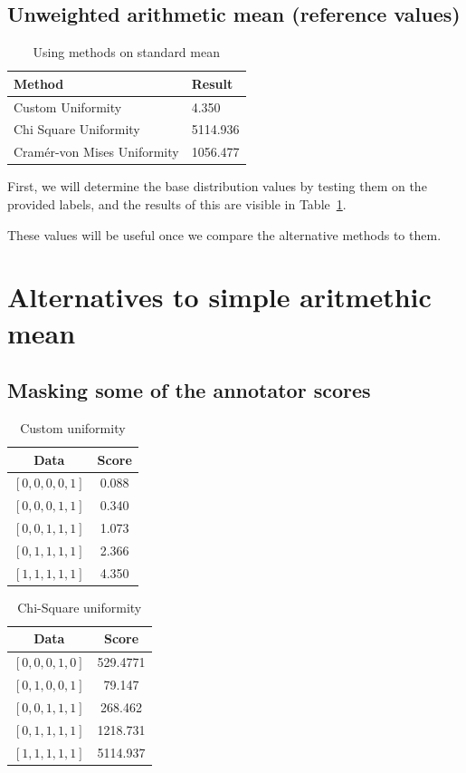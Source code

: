 \documentclass[10pt, a4paper]{article}
\begin{document}
\subsection{Unweighted arithmetic mean (reference values)}

\begin{table}
\caption{Using methods on standard mean}
\label{tab:t1}
\begin{center}
\begin{tabular}{ll}
\toprule
Method & Result \\
\midrule
Custom Uniformity & 4.350 \\
Chi Square Uniformity & 5114.936 \\
Cramér-von Mises Uniformity & 1056.477 \\
\bottomrule
\end{tabular}
\end{center}
\end{table}
First, we will determine the base distribution values by testing them on the provided labels, and the results of this are visible in Table~\ref{tab:t1}.

These values will be useful once we compare the alternative methods to them.

\section{Alternatives to simple aritmethic mean}
\subsection{Masking some of the annotator scores}
\begin{table}[ht]
\centering
\caption{Custom uniformity}
\begin{tabular}{|c|c|}
\hline
Data & Score \\
\hline
$[0, 0, 0, 0, 1]$ & 0.088 \\
$[0, 0, 0, 1, 1]$ & 0.340 \\
$[0, 0, 1, 1, 1]$ & 1.073 \\
$[0, 1, 1, 1, 1]$ & 2.366 \\
$[1, 1, 1, 1, 1]$ & 4.350 \\
\hline
\end{tabular}
\label{tab:custom-uniformity}
\end{table}

\begin{table}[ht]
\centering
\caption{Chi-Square uniformity}
\begin{tabular}{|c|c|}
\hline
Data & Score \\
\hline
$[0, 0, 0, 1, 0]$ & 529.4771 \\
$[0, 1, 0, 0, 1]$ & 79.147 \\
$[0, 0, 1, 1, 1]$ & 268.462 \\
$[0, 1, 1, 1, 1]$ & 1218.731 \\
$[1, 1, 1, 1, 1]$ & 5114.937 \\
\hline
\end{tabular}
\label{tab:chi-square-uniformity}
\end{table}
\end{document}

